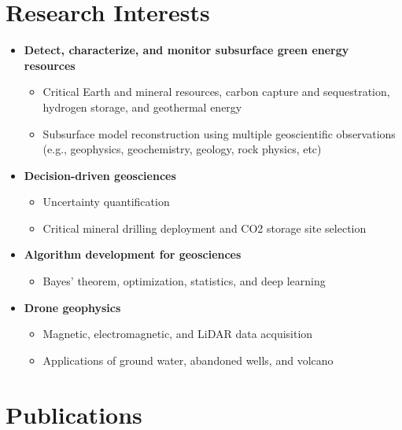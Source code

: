 \documentclass[11pt, a4paper]{article}
\begin{document}
\section*{Research Interests}
\begin{itemize}
	
	\item \textbf{Detect, characterize, and monitor subsurface green energy resources}
	    \begin{itemize}
		\item Critical Earth and mineral resources, carbon capture and sequestration, hydrogen storage, and geothermal energy
		\item Subsurface model reconstruction using multiple geoscientific observations (e.g., geophysics, geochemistry, geology, rock physics, etc)
		\end{itemize}

	\item \textbf{Decision-driven geosciences}
 		\begin{itemize}
		\item Uncertainty quantification
		\item Critical mineral drilling deployment and CO2 storage site selection
		\end{itemize}
		
	\item \textbf{Algorithm development for geosciences}
	\begin{itemize}
	\item Bayes’ theorem, optimization, statistics, and deep learning
	\end{itemize}		

	\item \textbf{Drone geophysics}
	 	\begin{itemize}
		\item Magnetic, electromagnetic, and LiDAR data acquisition
		\item Applications of ground water, abandoned wells, and volcano
		\end{itemize}

\end{itemize}




\section*{Publications}
\end{document}
